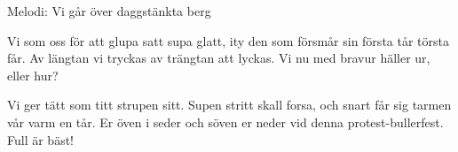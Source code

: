 \begin{song}

\begin{songmeta}
Melodi: Vi går över daggstänkta berg
\end{songmeta}

\begin{songtext}
Vi som oss för att glupa satt supa glatt,
ity den som försmår sin första tår törsta får.
Av längtan vi tryckas
av trängtan att lyckas.
Vi nu med bravur häller ur, eller hur?

Vi ger tätt som titt strupen sitt. Supen stritt
skall forsa, och snart får sig tarmen vår varm en tår.
Er öven i seder
och söven er neder
vid denna protest-bullerfest. Full är bäst!
\end{songtext}
\end{song}
